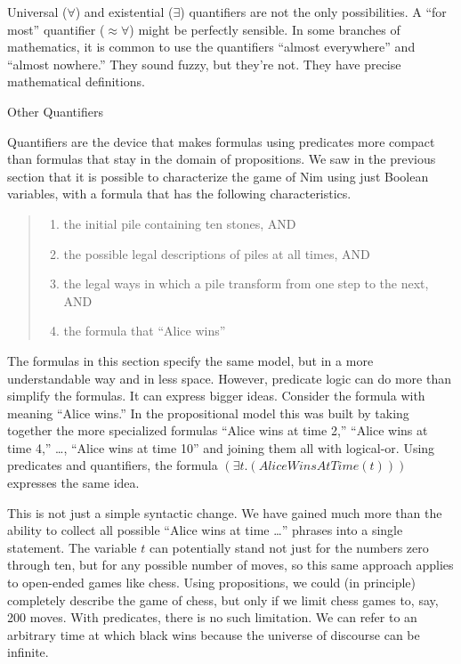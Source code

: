 {{\begin{aside}
Universal ($\forall$) and existential ($\exists$) quantifiers
are not the only possibilities.
A ``for most'' quantifier (${\approx}{\forall}$) might be perfectly sensible.
In some branches of mathematics, it is common to use the
quantifiers ``almost everywhere'' and ``almost nowhere.''
They sound fuzzy, but they're not.
They have precise mathematical definitions.
\caption{Other Quantifiers}
\label{aside:other-quantifiers}
\end{aside}

Quantifiers are the device that makes formulas using predicates more compact than
formulas that stay in the domain of propositions.
We saw in the previous section that it
is possible to characterize the game of Nim using just Boolean variables,
with a formula that has the following characteristics.

\begin{quote}
\begin{enumerate}
\item the initial pile containing ten stones, AND
\item the possible legal descriptions of piles at all times, AND
\item the legal ways in which a pile transform from one step to the next, AND
\item the formula that ``Alice wins''
\end{enumerate}
\end{quote}

The formulas in this section specify the same model, but in a more understandable
way and in less space.
However, predicate logic can do more than simplify the formulas.
It can express bigger ideas.
Consider the formula with meaning ``Alice wins.''
In the propositional model this was built by taking together the more specialized formulas
``Alice wins at time 2,'' ``Alice wins at time 4,'' \dots, ``Alice wins at time 10''
and joining them all with logical-or.
Using predicates and quantifiers, the formula $(\exists t.(AliceWinsAtTime(t)))$ expresses
the same idea.

This is not just a simple syntactic change.
We have gained much more than the ability to
collect all possible ``Alice wins at time \dots'' phrases into a single statement.
The variable $t$ can potentially stand not just for the numbers zero through ten,
but for any possible number of moves, so
this same approach applies to open-ended games like chess.
Using propositions, we could (in principle)
completely describe the game of chess, but only if we limit chess games to, say, 200 moves.
With predicates, there is no such limitation.
We can refer to an arbitrary time at which black wins because the universe of discourse
can be infinite.

}}

